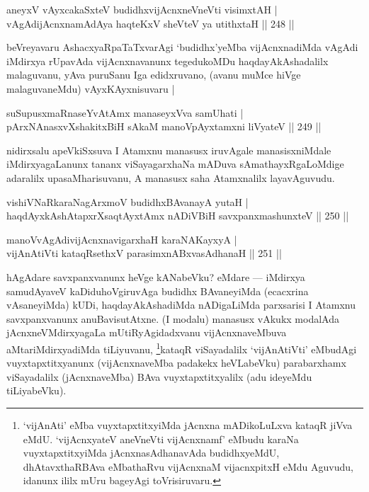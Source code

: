 
\begin{shl}
aneyxV vAyxcakaSxteV budidhxvijAcnxneVneVti visimxtAH |\\
vAgAdijAcnxnamAdAya haqteKxV sheVteV ya utithxtaH \hfill || 248 ||
\end{shl}

\begin{artha}
beVreyavaru AshacxyaRpaTaTxvarAgi `budidhx'yeMba vijAcnxnadiMda vAgAdi iMdirxya rUpavAda vijAcnxnavanunx tegedukoMDu haqdayAkAshadalilx malaguvanu, yAva puruSanu Iga edidxruvano, (avanu muMce hiVge malaguvaneMdu) vAyxKAyxnisuvaru |
\end{artha}


\begin{shl}
suSupusxmaRnaseYvA\s \s tAmx manaseyxVva samUhati |\\
pArxNAnasxvXshakitxBiH sAkaM manoV\s pAyxtamxni liVyateV \hfill || 249 ||
\end{shl}

\begin{artha}
nidirxsalu apeVkiSxsuva I Atamxnu manasusx iruvAgale manasisxniMdale  iMdirxyagaLanunx tananx viSayagarxhaNa mADuva sAmathayxRgaLoMdige adaralilx upasaMharisuvanu, A manasusx saha Atamxnalilx layavAguvudu.
\end{artha}

\begin{shl}
vishiVNaRkaraNagArxmoV budidhxBAvanayA yutaH |\\
haqdAyxkAshAtapxrXsaqtAyxtAmx nADiVBiH savxpanxmashunxteV \hfill || 250 ||
\end{shl}
\begin{shl}
manoVvAgAdivijAcnxnavigarxhaH karaNAKayxyA |\\
vijAnAtiVti kataqRsethxV parasimxnABxvasAdhanaH \hfill || 251 ||
\end{shl}

\begin{artha}
hAgAdare savxpanxvanunx heVge kANabeVku? eMdare  {\rm ---}  iMdirxya samudAyaveV kaDiduhoVgiruvAga budidhx BAvaneyiMda (ecacxrina vAsaneyiMda) kUDi, haqdayAkAshadiMda nADigaLiMda parxsarisi I Atamxnu savxpanxvanunx anuBavisutAtxne. (I modalu) manasusx vAkukx modalAda jAcnxneVMdirxyagaLa mUtiRyAgidadxvanu vijAcnxnaveMbuva aMtariMdirxyadiMda tiLiyuvanu, \footnote{`vijAnAti' eMba vuyxtapxtitxyiMda jAcnxna mADikoLuLxva kataqR jiVva eMdU. `vijAcnxyateV aneVneVti vijAcnxnamf' eMbudu karaNa vuyxtapxtitxyiMda jAcnxnasAdhanavAda budidhxyeMdU, dhAtavxthaRBAva eMbathaRvu vijAcnxnaM vijacnxpitxH eMdu Aguvudu, idanunx ililx mUru bageyAgi toVrisiruvaru.}kataqR viSayadalilx `vijAnAtiVti' eMbudAgi vuyxtapxtitxyanunx (vijAcnxnaveMba padakekx heVLabeVku) parabarxhamx viSayadalilx (jAcnxnaveMba) BAva vuyxtapxtitxyalilx (adu ideyeMdu tiLiyabeVku).
\end{artha}

